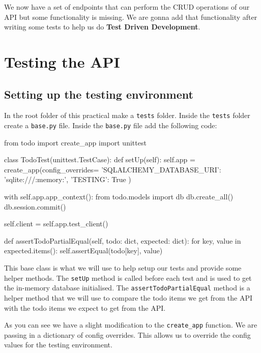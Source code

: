 \documentclass{csse4400}
\begin{document}
We now have a set of endpoints that can perform the CRUD operations of our API but some functionality is missing. We are gonna add that functionality after writing some tests to help us do \textbf{Test Driven Development}.

\section{Testing the API}

\subsection{Setting up the testing environment}

In the root folder of this practical make a \texttt{tests} folder. Inside the \texttt{tests} folder create a \texttt{base.py} file. Inside the \texttt{base.py} file add the following code:

\begin{code}[language=python,numbers=none]{}
  from todo import create_app
  import unittest
  
  
  class TodoTest(unittest.TestCase):
      def setUp(self):
          self.app = create_app(config_overrides={
              'SQLALCHEMY_DATABASE_URI': 'sqlite:///:memory:',
              'TESTING': True
          })
  
          with self.app.app_context():
              from todo.models import db
              db.create_all()
              db.session.commit()
          
          self.client = self.app.test_client()
  
      def assertTodoPartialEqual(self, todo: dict, expected: dict):
          for key, value in expected.items():
              self.assertEqual(todo[key], value)
\end{code}


This base class is what we will use to help setup our tests and provide some helper methods. The \texttt{setUp} method is called before each test and is used to get the in-memory database initialised. The \texttt{assertTodoPartialEqual} method is a helper method that we will use to compare the todo items we get from the API with the todo items we expect to get from the API.

As you can see we have a slight modification to the \texttt{create\_app} function. We are passing in a dictionary of config overrides. This allows us to override the config values for the testing environment.
\end{document}
